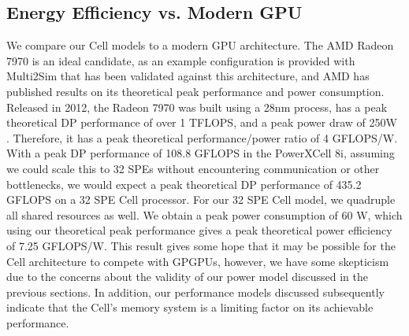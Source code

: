 \documentclass{sig-alternate-05-2015}
\begin{document}
\subsection{Energy Efficiency vs. Modern GPU}

We compare our Cell models to a modern GPU architecture. The AMD Radeon 7970 is an ideal candidate, as an example configuration is provided with Multi2Sim that has been validated against this architecture, and AMD has published results on its theoretical peak performance and power consumption. Released in 2012, the Radeon 7970 was built using a 28nm process, has a peak theoretical DP performance of over 1 TFLOPS, and a peak power draw of 250W \cite{radeon7970}. Therefore, it has a peak theoretical performance/power ratio of 4 GFLOPS/W. With a peak DP performance of 108.8 GFLOPS in the PowerXCell 8i, assuming we could scale this to 32 SPEs without encountering communication or other bottlenecks, we would expect a peak theoretical DP performance of 435.2 GFLOPS on a 32 SPE Cell processor. For our 32 SPE Cell model, we quadruple all shared resources as well. We obtain a peak power consumption of 60 W, which using our theoretical peak performance gives a peak theoretical power efficiency of 7.25 GFLOPS/W. This result gives some hope that it may be possible for the Cell architecture to compete with GPGPUs, however, we have some skepticism due to the concerns about the validity of our power model discussed in the previous sections. In addition, our performance models discussed subsequently indicate that the Cell's memory system is a limiting factor on its achievable performance.
\end{document}
